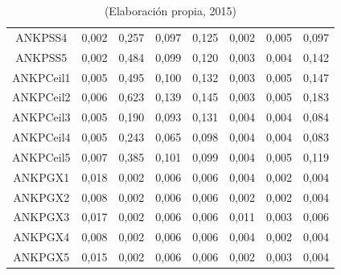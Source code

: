 \begin{table}[hbtp!]
\begin{center}
\begin{tabular}{cc|cccccc}
ANKPSS4 & 0,002 & 0,257 & 0,097 & 0,125 & 0,002 & 0,005 & 0,097 \\
ANKPSS5 & 0,002 & 0,484 & 0,099 & 0,120 & 0,003 & 0,004 & 0,142 \\ \hline
ANKPCeil1 & 0,005 & 0,495 & 0,100 & 0,132 & 0,003 & 0,005 & 0,147 \\
ANKPCeil2 & 0,006 & 0,623 & 0,139 & 0,145 & 0,003 & 0,005 & 0,183 \\
ANKPCeil3 & 0,005 & 0,190 & 0,093 & 0,131 & 0,004 & 0,004 & 0,084 \\
ANKPCeil4 & 0,005 & 0,243 & 0,065 & 0,098 & 0,004 & 0,004 & 0,083 \\
ANKPCeil5 & 0,007 & 0,385 & 0,101 & 0,099 & 0,004 & 0,005 & 0,119 \\ \hline
ANKPGX1 & 0,018 & 0,002 & 0,006 & 0,006 & 0,004 & 0,002 & 0,004 \\
ANKPGX2 & 0,008 & 0,002 & 0,006 & 0,006 & 0,002 & 0,002 & 0,004 \\
ANKPGX3 & 0,017 & 0,002 & 0,006 & 0,006 & 0,011 & 0,003 & 0,006 \\
ANKPGX4 & 0,008 & 0,002 & 0,006 & 0,006 & 0,004 & 0,002 & 0,004 \\
ANKPGX5 & 0,015 & 0,002 & 0,006 & 0,006 & 0,002 & 0,003 & 0,004 \\
\hline
\end{tabular}
\end{center}
\caption*{(Elaboración propia, 2015)}
\end{table}

